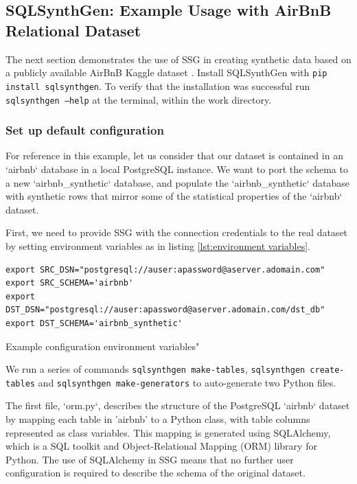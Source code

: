 \documentclass[11pt]{article}
\begin{document}
\subsection{SQLSynthGen: Example Usage with AirBnB Relational Dataset}

The next section demonstrates the use of SSG in creating synthetic data based on a publicly available AirBnB Kaggle dataset \cite{airbnb}. Install SQLSynthGen with \texttt{pip install sqlsynthgen}. To verify that the installation was successful run \texttt{sqlsynthgen --help} at the terminal, within the work directory. 

\subsubsection{Set up default configuration}

For reference in this example, let us consider that our dataset is contained in an `airbnb` database in a local PostgreSQL instance. We want to port the schema to a new `airbnb\_synthetic` database, and populate the `airbnb\_synthetic` database with synthetic rows that mirror some of the statistical properties of the `airbnb` dataset.

First, we need to provide SSG with the connection credentials to the real dataset by setting environment variables as in listing \ref{lst:environment variables}.

\begin{listing}[H]
\begin{verbatim}
export SRC_DSN="postgresql://auser:apassword@aserver.adomain.com"
export SRC_SCHEMA='airbnb'
export DST_DSN="postgresql://auser:apassword@aserver.adomain.com/dst_db"
export DST_SCHEMA='airbnb_synthetic'
\end{verbatim}
\caption{Example configuration environment variables"}
\label{lst:environment variables}
\end{listing}

We run a series of commands \texttt{sqlsynthgen make-tables}, \texttt{sqlsynthgen create-tables} and \texttt{sqlsynthgen make-generators} to auto-generate two Python files. 

The first file, `orm.py`, describes the structure of the PostgreSQL `airbnb` dataset by mapping each table in 'airbnb' to a Python class, with table columns represented as class variables. This mapping is generated using SQLAlchemy\cite{sqlalchemy}, which is a SQL toolkit and Object-Relational Mapping (ORM) library for Python. The use of SQLAlchemy in SSG means that no further user configuration is required to describe the schema of the original dataset. 
\end{document}
